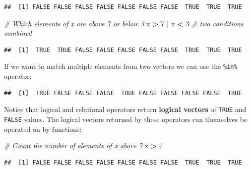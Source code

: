 \documentclass[]{book}
\newenvironment{Shaded}{\begin{snugshade}}{\end{snugshade}}
\newcommand{\CommentTok}[1]{\textcolor[rgb]{0.56,0.35,0.01}{\textit{#1}}}
\newcommand{\DecValTok}[1]{\textcolor[rgb]{0.00,0.00,0.81}{#1}}
\newcommand{\KeywordTok}[1]{\textcolor[rgb]{0.13,0.29,0.53}{\textbf{#1}}}
\newcommand{\NormalTok}[1]{#1}
\newcommand{\OperatorTok}[1]{\textcolor[rgb]{0.81,0.36,0.00}{\textbf{#1}}}
\newcommand{\StringTok}[1]{\textcolor[rgb]{0.31,0.60,0.02}{#1}}
\begin{document}
\begin{verbatim}
##  [1] FALSE FALSE FALSE FALSE FALSE FALSE FALSE  TRUE  TRUE  TRUE
\end{verbatim}

\begin{Shaded}
\begin{Highlighting}[]
\CommentTok{# Which elements of x are above 7 or below 3}
\NormalTok{x }\OperatorTok{>}\StringTok{ }\DecValTok{7} \OperatorTok{|}\StringTok{ }\NormalTok{x }\OperatorTok{<}\StringTok{ }\DecValTok{3} \CommentTok{# two conditions combined}
\end{Highlighting}
\end{Shaded}

\begin{verbatim}
##  [1]  TRUE  TRUE FALSE FALSE FALSE FALSE FALSE  TRUE  TRUE  TRUE
\end{verbatim}

If we want to match multiple elements from two vectors we can use the \texttt{\%in\%} operator:

\begin{Shaded}
\end{Shaded}

\begin{verbatim}
##  [1]  TRUE FALSE FALSE FALSE  TRUE FALSE FALSE FALSE FALSE  TRUE
\end{verbatim}

Notice that logical and relational operators return \textbf{logical vectors} of \texttt{TRUE} and \texttt{FALSE} values.
The logical vectors returned by these operators can themselves be operated on by functions:

\begin{Shaded}
\begin{Highlighting}[]
\CommentTok{# Count the number of elements of x above 7}
\NormalTok{x }\OperatorTok{>}\StringTok{ }\DecValTok{7}
\end{Highlighting}
\end{Shaded}

\begin{verbatim}
##  [1] FALSE FALSE FALSE FALSE FALSE FALSE FALSE  TRUE  TRUE  TRUE
\end{verbatim}
\end{document}
